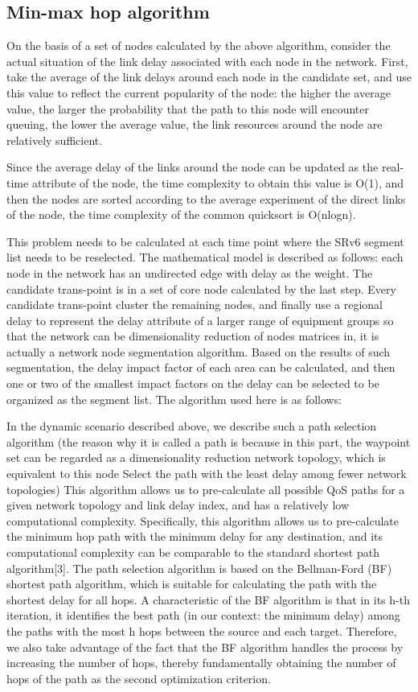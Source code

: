 \documentclass[conference]{IEEEtran}
\begin{document}
\subsection{Min-max hop algorithm}
On the basis of a set of nodes calculated by the above algorithm, consider the actual situation of the link delay associated with each node in the network. First, take the average of the link delays around each node in the candidate set, and use this value to reflect the current popularity of the node: the higher the average value, the larger the probability that the path to this node will encounter queuing, the lower the average value, the link resources around the node are relatively sufficient. 

Since the average delay of the links around the node can be updated as the real-time attribute of the node, the time complexity to obtain this value is O(1), and then the nodes are sorted according to the average experiment of the direct links of the node, the time complexity of the common quicksort is O(nlogn).

This problem needs to be calculated at each time point where the SRv6 segment list needs to be reselected. The mathematical model is described as follows: each node in the network has an undirected edge with delay as the weight. The candidate trans-point is in a set of core node calculated by the last step. Every candidate trans-point cluster the remaining nodes, and finally use a regional delay to represent the delay attribute of a larger range of equipment groups so that the network can be dimensionality reduction of nodes matrices in, it is actually a network node segmentation algorithm. Based on the results of such segmentation, the delay impact factor of each area can be calculated, and then one or two of the smallest impact factors on the delay can be selected to be organized as the segment list. The algorithm used here is as follows:

In the dynamic scenario described above, we describe such a path selection algorithm (the reason why it is called a path is because in this part, the waypoint set can be regarded as a dimensionality reduction network topology, which is equivalent to this node Select the path with the least delay among fewer network topologies) This algorithm allows us to pre-calculate all possible QoS paths for a given network topology and link delay index, and has a relatively low computational complexity. Specifically, this algorithm allows us to pre-calculate the minimum hop path with the minimum delay for any destination, and its computational complexity can be comparable to the standard shortest path algorithm[3]. The path selection algorithm is based on the Bellman-Ford (BF) shortest path algorithm, which is suitable for calculating the path with the shortest delay for all hops. A characteristic of the BF algorithm is that in its h-th iteration, it identifies the best path (in our context: the minimum delay) among the paths with the most h hops between the source and each target. Therefore, we also take advantage of the fact that the BF algorithm handles the process by increasing the number of hops, thereby fundamentally obtaining the number of hops of the path as the second optimization criterion.
\end{document}
